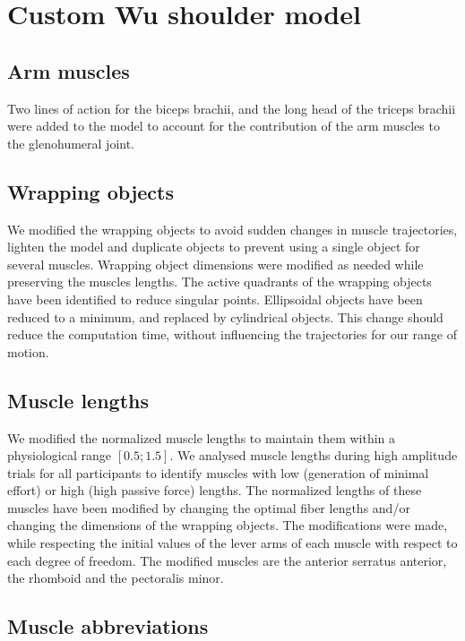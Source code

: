 \section{Custom Wu shoulder model}
\label{sec:custom-wu-shoulder-model}

\subsection{Arm muscles}\label{subsec:arm-muscles}

Two lines of action for the biceps brachii, and the long head of the triceps brachii were added to the model to account for the contribution of the arm muscles to the glenohumeral joint.

\subsection{Wrapping objects}\label{subsec:wrapping-objects}

We modified the wrapping objects to avoid sudden changes in muscle trajectories, lighten the model and duplicate objects to prevent using a single object for several muscles.
Wrapping object dimensions were modified as needed while preserving the muscles lengths.
The active quadrants of the wrapping objects have been identified to reduce singular points.
Ellipsoidal objects have been reduced to a minimum, and replaced by cylindrical objects.
This change should reduce the computation time, without influencing the trajectories for our range of motion.

\subsection{Muscle lengths}
\label{subsec:muscle-lengths}

We modified the normalized muscle lengths to maintain them within a physiological range $[0.5;1.5]$.
We analysed muscle lengths during high amplitude trials for all participants to identify muscles with low (generation of minimal effort) or high (high passive force) lengths.
The normalized lengths of these muscles have been modified by changing the optimal fiber lengths and/or changing the dimensions of the wrapping objects.
The modifications were made, while respecting the initial values of the lever arms of each muscle with respect to each degree of freedom.
The modified muscles are the anterior serratus anterior, the rhomboid and the pectoralis minor.

\subsection{Muscle abbreviations}\label{subsec:muscle-abbreviations}

